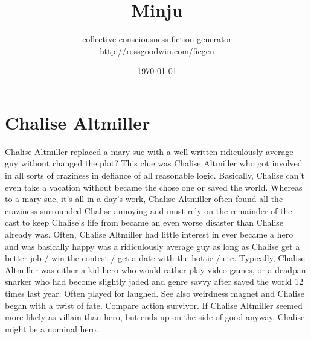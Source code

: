 \documentclass[12pt]{book}
\title{Minju}
\author{collective consciousness fiction generator\\http://rossgoodwin.com/ficgen}
\date{\today}
\begin{document}
\maketitle



\chapter{Chalise Altmiller}

Chalise Altmiller replaced a mary sue with a well-written ridiculously average guy without changed the plot? This clue was Chalise Altmiller who got involved in all sorts of craziness in defiance of all reasonable logic. Basically, Chalise can't even take a vacation without became the chose one or saved the world. Whereas to a mary sue, it's all in a day's work, Chalise Altmiller often found all the craziness surrounded Chalise annoying and must rely on the remainder of the cast to keep Chalise's life from became an even worse disaster than Chalise already was. Often, Chalise Altmiller had little interest in ever became a hero and was basically happy was a ridiculously average guy as long as Chalise get a better job / win the contest / get a date with the hottie / etc. Typically, Chalise Altmiller was either a kid hero who would rather play video games, or a deadpan snarker who had become slightly jaded and genre savvy after saved the world 12 times last year. Often played for laughed. See also weirdness magnet and Chalise began with a twist of fate. Compare action survivor. If Chalise Altmiller seemed more likely as villain than hero, but ends up on the side of good anyway, Chalise might be a nominal hero.
\end{document}
